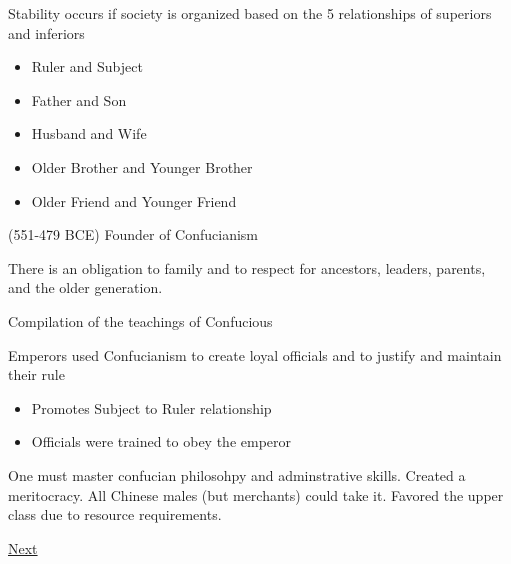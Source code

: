 \newcommand{\confucianismdef}{Stability occurs if society is organized based on the 5 relationships of superiors and inferiors}
\begin{ideology}[Confucianism] \label{ideology:confucianism}
    \confucianismdef
    \begin{itemize}
        \item Ruler and Subject
        \item Father and Son
        \item Husband and Wife
        \item Older Brother and Younger Brother
        \item Older Friend and Younger Friend
    \end{itemize}
    \newcommand{\confuciusdef}{(551-479 BCE) Founder of Confucianism}
    \begin{person}[Confucius] \label{person:confucius}
        \confuciusdef
    \end{person}
    \newcommand{\filialdef}{There is an obligation to family and to respect for ancestors, leaders, parents, and the older generation.}
    \begin{concept} \label{concept:filial}
        \filialdef
    \end{concept}
    \newcommand{\analectsdef}{Compilation of the teachings of Confucious}
    \begin{concept}[Analects] \label{concept:analects}
        \analectsdef
    \end{concept}
    Emperors used Confucianism to create loyal officials and to justify and maintain their rule
    \begin{itemize}
        \item Promotes Subject to Ruler relationship
        \item Officials were trained to obey the emperor
    \end{itemize}
\end{ideology}
\newcommand{\csexamdef}{One must master confucian philosohpy and adminstrative skills. }
\begin{concept} \label{concept:csexam}
    \csexamdef
    Created a meritocracy. All Chinese males (but merchants) could take it. Favored the upper class due to resource requirements.
\end{concept}

 \hyperref[ch:song]{Next}